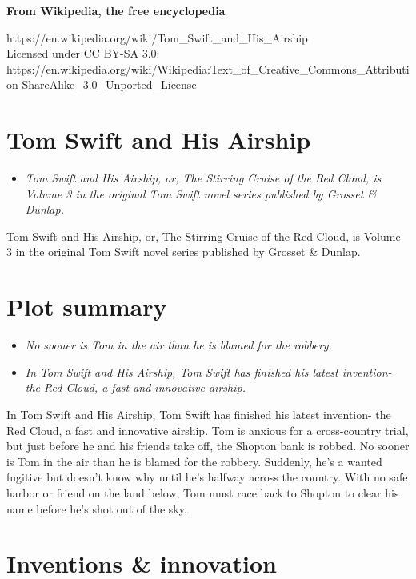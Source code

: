 \textbf{From Wikipedia, the free encyclopedia}

https://en.wikipedia.org/wiki/Tom\_Swift\_and\_His\_Airship\\
Licensed under CC BY-SA 3.0:\\
https://en.wikipedia.org/wiki/Wikipedia:Text\_of\_Creative\_Commons\_Attribution-ShareAlike\_3.0\_Unported\_License

\section{Tom Swift and His Airship}\label{tom-swift-and-his-airship}

\begin{itemize}
\item
  \emph{Tom Swift and His Airship, or, The Stirring Cruise of the Red
  Cloud, is Volume 3 in the original Tom Swift novel series published by
  Grosset \& Dunlap.}
\end{itemize}

Tom Swift and His Airship, or, The Stirring Cruise of the Red Cloud, is
Volume 3 in the original Tom Swift novel series published by Grosset \&
Dunlap.

\section{Plot summary}\label{plot-summary}

\begin{itemize}
\item
  \emph{No sooner is Tom in the air than he is blamed for the robbery.}
\item
  \emph{In Tom Swift and His Airship, Tom Swift has finished his latest
  invention- the Red Cloud, a fast and innovative airship.}
\end{itemize}

In Tom Swift and His Airship, Tom Swift has finished his latest
invention- the Red Cloud, a fast and innovative airship. Tom is anxious
for a cross-country trial, but just before he and his friends take off,
the Shopton bank is robbed. No sooner is Tom in the air than he is
blamed for the robbery. Suddenly, he's a wanted fugitive but doesn't
know why until he's halfway across the country. With no safe harbor or
friend on the land below, Tom must race back to Shopton to clear his
name before he's shot out of the sky.

\section{Inventions \& innovation}\label{inventions-innovation}

